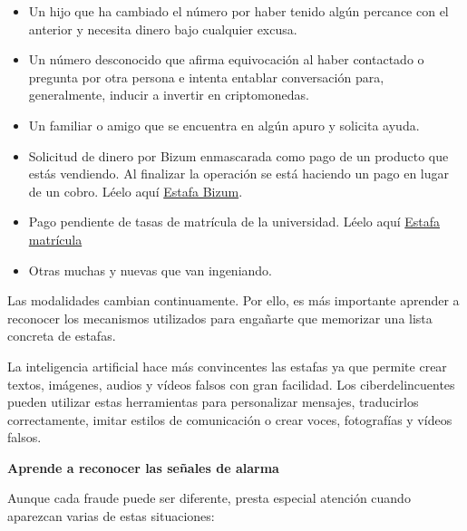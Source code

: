 \documentclass[
  spanish,
  a4paper,
  openany]{book}
\begin{document}
\begin{itemize}
\item
  Un hijo que ha cambiado el número por haber tenido algún percance con el anterior y necesita dinero bajo cualquier excusa.
\item
  Un número desconocido que afirma equivocación al haber contactado o pregunta por otra persona e intenta entablar conversación para, generalmente, inducir a invertir en criptomonedas.
\item
  Un familiar o amigo que se encuentra en algún apuro y solicita ayuda.
\item
  Solicitud de dinero por Bizum enmascarada como pago de un producto que estás vendiendo. Al finalizar la operación se está haciendo un pago en lugar de un cobro. Léelo aquí \href{https://bizum.es/blog/estafa-bizum/}{Estafa Bizum}.
\item
  Pago pendiente de tasas de matrícula de la universidad. Léelo aquí \href{https://www.incibe.es/ciudadania/avisos/si-eres-universitario-no-caigas-en-este-engano-sobre-el-pago-de-tu-matricula}{Estafa matrícula}
\item
  Otras muchas y nuevas que van ingeniando.
\end{itemize}

Las modalidades cambian continuamente. Por ello, es más importante aprender a reconocer los mecanismos utilizados para engañarte que memorizar una lista concreta de estafas.

La inteligencia artificial hace más convincentes las estafas ya que permite crear textos, imágenes, audios y vídeos falsos con gran facilidad. Los ciberdelincuentes pueden utilizar estas herramientas para personalizar mensajes, traducirlos correctamente, imitar estilos de comunicación o crear voces, fotografías y vídeos falsos.

\textbf{Aprende a reconocer las señales de alarma}

Aunque cada fraude puede ser diferente, presta especial atención cuando aparezcan varias de estas situaciones:
\end{document}
